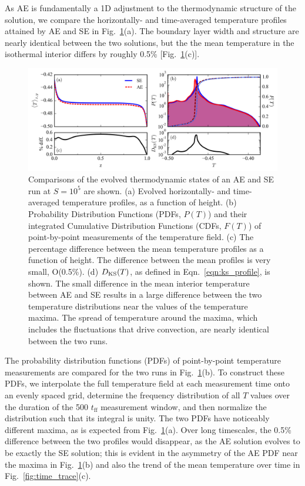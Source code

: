 As AE is fundamentally a 1D adjustment to the thermodynamic structure of the solution, we compare the horizontally- and time-averaged temperature profiles attained by AE and SE in Fig.~\ref{fig:temp_comparison}(a).  
The boundary layer width and structure are nearly identical between the two solutions, but the the mean temperature in the isothermal interior differs by roughly 0.5\% [Fig.~\ref{fig:temp_comparison}(c)]. 

\begin{figure}[ht!]
\includegraphics[width=\textwidth]{./figs/temp_comparison.pdf}
\caption[Evolved thermodynamic states of AE and SE simulations.]
{
	Comparisons of the evolved thermodynamic states of an AE and SE run at $S = 10^{5}$ are shown.  
	(a) Evolved horizontally- and time-averaged temperature profiles, as a function of height.
	(b) Probability Distribution Functions (PDFs, $P(T)$) and their integrated Cumulative Distribution Functions (CDFs, $F(T)$) of point-by-point measurements of the temperature field.
	(c) The percentage difference between the mean temperature profiles as a function of height.
	The difference between the mean profiles is very small, O(0.5\%).
	(d) $D_{\text{KS}}(T)$, as defined in Eqn.~\ref{eqn:ks_profile}, is shown. 
	The small difference in the mean interior temperature between AE and SE results in a large difference between the two temperature distributions near the values of the temperature maxima.  
	The spread of temperature around the maxima, which includes the fluctuations that drive convection, are nearly identical between the two runs. 
	\label{fig:temp_comparison} 
}
\end{figure}

The probability distribution functions (PDFs) of point-by-point temperature measurements are compared for the two runs in Fig.~\ref{fig:temp_comparison}(b). 
To construct these PDFs, we interpolate the full temperature field at each measurement time onto an evenly spaced grid, determine the frequency distribution of all $T$ values over the duration of the 500 $t_{\text{ff}}$ measurement window, and then normalize the distribution such that its integral is unity.  
The two PDFs have noticeably different maxima, as is expected from Fig.~\ref{fig:temp_comparison}(a). 
Over long timescales, the 0.5\% difference between the two profiles would disappear, as the AE solution evolves to be exactly the SE solution; this is evident in the asymmetry of the AE PDF near the maxima in Fig.~\ref{fig:temp_comparison}(b) and also the trend of the mean temperature over time in Fig.~\ref{fig:time_trace}(c).

